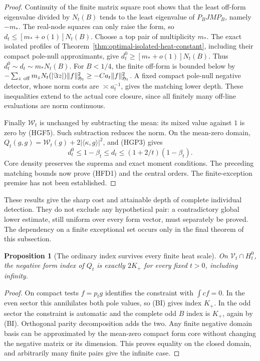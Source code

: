 \documentclass[11pt]{article}
\newtheorem{proposition}[theorem]{Proposition}
\theoremstyle{remark}\newtheorem{remark}[theorem]{Remark}
\begin{document}
\begin{proof}
Continuity of the finite matrix square root shows that the least
off-form eigenvalue divided by $N_t(B)$ tends to the least eigenvalue
of $P_BJM P_B$, namely $-m_*$. The real-node squares can only raise
the form, so $d_t\le[m_*+o(1)]N_t(B)$.
Choose a top pair of multiplicity $m_*$. The exact isolated profiles
of Theorem~\ref{thm:optimal-isolated-heat-constant}, including their
compact pole-null approximants, give
$d_t^0\ge[m_*+o(1)]N_t(B)$. Thus $d_t^0\sim d_t\sim m_*N_t(B)$.
For $B<1/4$, the finite off-form is bounded below by
$-\sum_{z\ {\rm off}}m_zN_t(|\Im z|)\|f\|_{\mathfrak H_t}^2
\ge-Ca_t\|f\|_{\mathfrak H_t}^2$.
A fixed compact pole-null negative detector, whose norm costs are
$\asymp a_t^{-1}$, gives the matching lower depth.
These inequalities extend to the actual core closure, since all
finitely many off-line evaluations are norm continuous.

Finally $\mathcal W_t$ is unchanged by subtracting the mean:
its mixed value against $1$ is zero by (HGF5).
Such subtraction reduces the norm. On the mean-zero domain,
$Q_t(g,g)=\mathcal W_t(g)+2|\langle\kappa,g\rangle|^2$, and (HGP3)
gives
\[
 d_t^0\le1-\beta_t\le d_t\le(1+2/t)(1-\beta_t).              \tag{HFD4}
\]
Core density preserves the suprema and exact moment conditions.
The preceding matching bounds now prove (HFD1) and the central
orders. The finite-exception premise has not been established.
\end{proof}

These results give the sharp cost and attainable depth of complete
individual detection. They do not exclude any hypothetical pair:
a contradictory global lower estimate, still uniform over every
form vector, must separately be proved. The dependency on a finite exceptional set occurs only in the
final theorem of this subsection.

\begin{proposition}[The ordinary index survives every finite heat scale]
\label{prop:heat-index}
On $\mathcal V_t\cap H_t^0$, the negative form index of $Q_t$
is exactly $2K_+$ for every fixed $t>0$, including infinity.
\end{proposition}
\begin{proof}
On compact tests $f=p_tg$ identifies the constraint with
$\int cf=0$. In the even sector this annihilates both pole
values, so (BI) gives index $K_+$. In the odd sector the
constraint is automatic and the complete odd $B$ index is
$K_+$, again by (BI). Orthogonal parity decomposition adds
the two. Any finite negative domain basis can be approximated
by the mean-zero compact form core without changing the
negative matrix or its dimension. This proves equality
on the closed domain, and arbitrarily many finite pairs
give the infinite case.
\end{proof}
\end{document}
